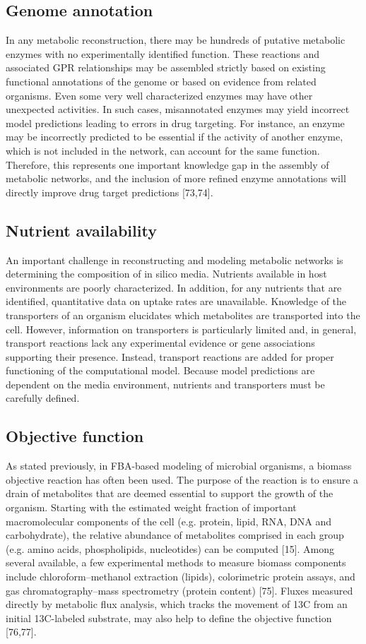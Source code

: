 \subsection{Genome annotation}
In any metabolic reconstruction, there may be 
hundreds of putative metabolic enzymes with no 
experimentally identified function. These reactions 
and associated GPR relationships may be assembled 
strictly based on existing functional annotations 
of the genome or based on evidence from related 
organisms. Even some very well characterized enzymes 
may have other unexpected activities. In such cases, 
misannotated enzymes may yield incorrect model 
predictions leading to errors in drug targeting. For 
instance, an enzyme may be incorrectly predicted to be 
essential if the activity of another enzyme, which is 
not included in the network, can account for the same function. 
Therefore, this represents one important knowledge gap in 
the assembly of metabolic networks, and the inclusion of 
more refined enzyme annotations will directly improve 
drug target predictions [73,74].

\subsection{Nutrient availability}
An important challenge in reconstructing and modeling 
metabolic networks is determining the composition of 
in silico media. Nutrients available in host environments 
are poorly characterized. In addition, for any nutrients 
that are identified, quantitative data on uptake rates 
are unavailable. Knowledge of the transporters of an 
organism elucidates which metabolites are transported 
into the cell. However, information on transporters 
is particularly limited and, in general, transport 
reactions lack any experimental evidence or gene 
associations supporting their presence. Instead, 
transport reactions are added for proper functioning 
of the computational model. Because model predictions are 
dependent on the media environment, nutrients and 
transporters must be carefully defined.

\subsection{Objective function}
As stated previously, in FBA-based modeling of microbial organisms, 
a biomass objective reaction has often been used. The purpose of 
the reaction is to ensure a drain of metabolites that 
are deemed essential to support the growth of the 
organism. Starting with the estimated weight fraction 
of important macromolecular components of the cell 
(e.g. protein, lipid, RNA, DNA and carbohydrate), the 
relative abundance of metabolites comprised in each 
group (e.g. amino acids, phospholipids, nucleotides) 
can be computed [15]. Among several available, a few 
experimental methods to measure biomass components 
include chloroform–methanol extraction (lipids), 
colorimetric protein assays, and gas chromatography–mass 
spectrometry (protein content) [75]. Fluxes measured 
directly by metabolic flux analysis, which tracks 
the movement of 13C from an initial 13C-labeled 
substrate, may also help to define the objective 
function [76,77].

